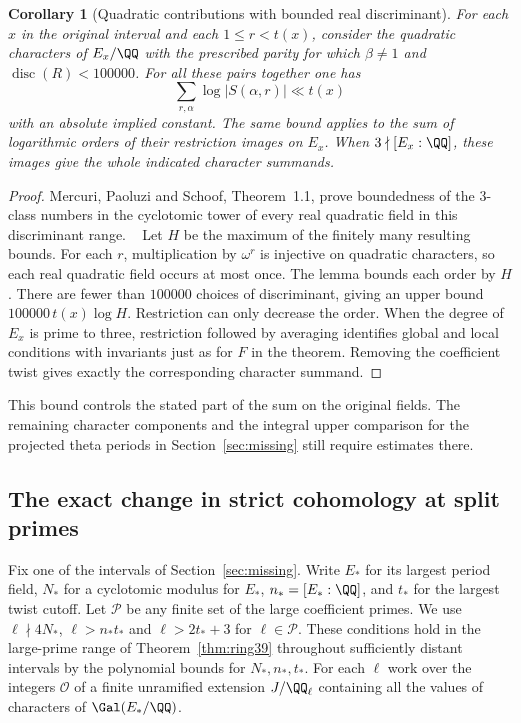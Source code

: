 \documentclass[a4paper,11pt]{article}
\newtheorem{corollary}[proposition]{Corollary}
\theoremstyle{definition}
\theoremstyle{remark}
\numberwithin{equation}{section}
\newcommand{\OO}{\mathcal O}
\begin{document}
\begin{corollary}[Quadratic contributions with bounded real discriminant]
\leavevmode\label{cor:quadraticrange609}
For each \(x\) in the original interval and each \(1\le r<t(x)\),
consider the quadratic characters of \(E_x/\QQ\) with the
prescribed parity for which \(\beta\ne1\) and
\(\operatorname{disc}(R)<100000\). For all these pairs together
one has
\[
                       \sum_{r,\alpha}\log |S(\alpha,r)|\ll t(x)
\]
with an absolute implied constant. The same bound applies
to the sum of logarithmic orders of their restriction images
on \(E_x\). When \(3\nmid[E_x:\QQ]\), these images give the
whole indicated character summands.
\end{corollary}
\begin{proof}
Mercuri, Paoluzi and Schoof, Theorem~1.1, prove boundedness
of the \(3\)-class numbers in the cyclotomic tower of every
real quadratic field in this discriminant range.
~\cite{IV-II-mps609}
Let \(H\) be the maximum of the finitely many resulting bounds.
For each \(r\), multiplication by \(\omega^r\) is injective on
quadratic characters, so each real quadratic field occurs at
most once. The lemma bounds each order by \(H\). There are
fewer than \(100000\) choices of discriminant, giving an upper
bound \(100000\,t(x)\log H\). Restriction can only decrease
the order. When the degree of \(E_x\) is prime to three,
restriction followed by averaging identifies global and local
conditions with invariants just as for \(F\) in the theorem.
Removing the coefficient twist gives exactly the corresponding
character summand.
\end{proof}

This bound controls the stated part of the sum on the original
fields. The remaining character components and the integral
upper comparison for the projected theta periods in
Section~\ref{sec:missing} still require estimates there.


\subsection{The exact change in strict cohomology at split primes}
\label{sec:matchedstrict617}

Fix one of the intervals of Section~\ref{sec:missing}. Write \(E_*\)
for its largest period field, \(N_*\) for a cyclotomic modulus for
\(E_*\), \(n_*=[E_*:\QQ]\), and \(t_*\) for the largest twist cutoff.
Let \(\mathcal P\) be any finite set of the large coefficient primes.
We use \(\ell\nmid 4N_*\), \(\ell>n_*t_*\) and \(\ell>2t_*+3\)
for \(\ell\in\mathcal P\). These conditions hold in the large-prime
range of Theorem~\ref{thm:ring39} throughout sufficiently distant
intervals by the polynomial bounds for \(N_*,n_*,t_*\).
For each \(\ell\) work over the integers \(\OO\) of a finite
unramified extension \(J/\QQ_\ell\) containing all the values of
characters of \(\Gal(E_*/\QQ)\).
\end{document}
